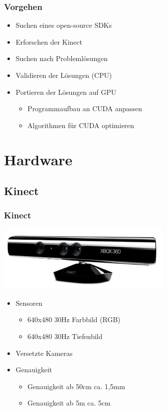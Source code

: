 \documentclass[compress]{beamer}
\begin{document}
\begin{frame}
\frametitle{Vorgehen}

\begin{itemize}
	\item Suchen eines open-source SDKs
	\item Erforschen der Kinect
	\item Suchen nach Problemlösungen
	\item Validieren der Lösungen (CPU)
	\item Portieren der Lösungen auf GPU
	\begin{itemize}
		\item Programmaufbau an CUDA anpassen 
		\item Algorithmen für CUDA optimieren
	\end{itemize}
	
\end{itemize}
\end{frame}

\section{Hardware}

\subsection{Kinect}
\begin{frame}
\frametitle{Kinect}

\hspace*{1.8cm}\includegraphics[width=8.5cm]{kin.jpg}

\begin{itemize}
	\item Sensoren
	\begin{itemize}
		\item 640x480 \@ 30Hz Farbbild (RGB)
		\item 640x480 \@ 30Hz Tiefenbild
	\end{itemize}
    \item Versetzte Kameras
	\item Genauigkeit
	\begin{itemize}
		\item Genauigkeit ab 50cm ca. 1,5mm
		\item Genauigkeit ab 5m ca. 5cm
	\end{itemize}
\end{itemize}
\end{frame}
\end{document}
